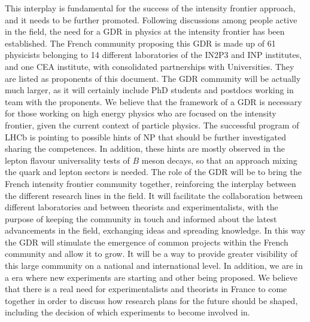 This interplay is fundamental for the success of the intensity frontier approach, and it needs to be further promoted.  
Following discussions among people active in the field, the need for a GDR in physics at the intensity frontier has been established. The French community proposing this GDR is made up of 61 physicists belonging to 14 different laboratories of the IN2P3 and INP institutes, and one CEA institute, with consolidated partnerships with Universities. They are listed as proponents of this document. The GDR community will be actually much larger, as it will certainly include PhD students and postdocs working in team with the proponents.  We believe that the framework of a GDR is necessary for those working on high energy physics who are focused on the intensity frontier, given the current context of particle physics. The successful program of LHCb is pointing to possible hints of NP that should be further investigated sharing the competences. In addition, these hints are mostly observed in the lepton flavour universality tests of $B$ meson decays, so that an approach mixing the quark and lepton sectors is needed.    
 The role of the GDR will be  to bring the French intensity frontier community together,  reinforcing the interplay between the different research lines in the field. It will facilitate the collaboration between different laboratories and between theorists and experimentalists, with the purpose of keeping the community in touch and informed about the latest advancements in the field, exchanging ideas and spreading knowledge. In this way the GDR will stimulate the emergence of common projects within the French community and allow it to grow. It will be a way to provide greater visibility of this large community on a national and international level. In addition,  we are in a era where new experiments are starting and other being proposed. We believe that there is a real need for experimentalists and theorists in France to come together in order to discuss how research plans for the future should be shaped, including the decision of which experiments to become involved in.

